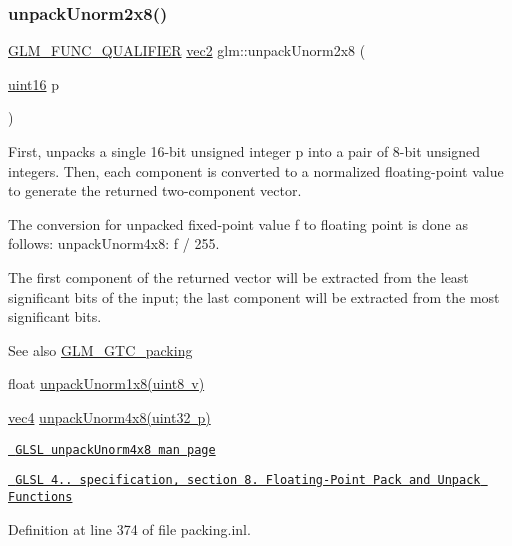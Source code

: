 \subsubsection{\texorpdfstring{unpackUnorm2x8()}{unpackUnorm2x8()}}
{\footnotesize\ttfamily \mbox{\hyperlink{setup_8hpp_a33fdea6f91c5f834105f7415e2a64407}{G\+L\+M\+\_\+\+F\+U\+N\+C\+\_\+\+Q\+U\+A\+L\+I\+F\+I\+ER}} \mbox{\hyperlink{group__core__types_gaa1618f51db67eaa145db101d8c8431d8}{vec2}} glm\+::unpack\+Unorm2x8 (\begin{DoxyParamCaption}\item[{\mbox{\hyperlink{group__gtc__type__precision_gad8c2939e1fdd8e5828b31d95c52255d5}{uint16}}}]{p }\end{DoxyParamCaption})}

First, unpacks a single 16-\/bit unsigned integer p into a pair of 8-\/bit unsigned integers. Then, each component is converted to a normalized floating-\/point value to generate the returned two-\/component vector.

The conversion for unpacked fixed-\/point value f to floating point is done as follows\+: unpack\+Unorm4x8\+: f / 255.

The first component of the returned vector will be extracted from the least significant bits of the input; the last component will be extracted from the most significant bits.

\begin{DoxySeeAlso}{See also}
\mbox{\hyperlink{group__gtc__packing}{G\+L\+M\+\_\+\+G\+T\+C\+\_\+packing}} 

float \mbox{\hyperlink{group__gtc__packing_ga32f3f2642df2ea87449d59fb614a8305}{unpack\+Unorm1x8(uint8 v)}} 

\mbox{\hyperlink{group__core__types_ga5881b1b022d7fd1b7218f5916532dd02}{vec4}} \mbox{\hyperlink{group__core__func__packing_ga1ec646af4b27982d175672bddd642792}{unpack\+Unorm4x8(uint32 p)}} 

\href{http://www.opengl.org/sdk/docs/manglsl/xhtml/unpackUnorm4x8.xml}{\texttt{ G\+L\+SL unpack\+Unorm4x8 man page}} 

\href{http://www.opengl.org/registry/doc/GLSLangSpec.4.20.8.pdf}{\texttt{ G\+L\+SL 4.. specification, section 8. Floating-\/\+Point Pack and Unpack Functions}} 
\end{DoxySeeAlso}


Definition at line 374 of file packing.\+inl.

\mbox{\label{group__gtc__packing_gaf69ace2b5e9234f8afb4e99c3df1193d}} 
